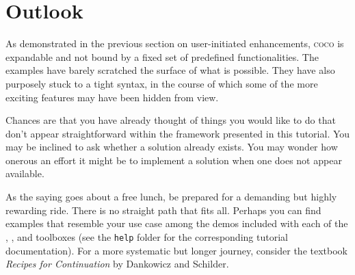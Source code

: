 \section{Outlook}
As demonstrated in the previous section on user-initiated enhancements, \textsc{coco} is expandable and not bound by a fixed set of predefined functionalities. The examples have barely scratched the surface of what is possible. They have also purposely stuck to a tight syntax, in the course of which some of the more exciting features may have been hidden from view.

Chances are that you have already thought of things you would like to do that don't appear straightforward within the framework presented in this tutorial. You may be inclined to ask whether a solution already exists. You may wonder how onerous an effort it might be to implement a solution when one does not appear available. 

As the saying goes about a free lunch, be prepared for a demanding but highly rewarding ride. There is no straight path that fits all. Perhaps you can find examples that resemble your use case among the demos included with each of the , , and  toolboxes (see the \texttt{help} folder for the corresponding tutorial documentation). For a more systematic but longer journey, consider the textbook \emph{Recipes for Continuation} by Dankowicz and Schilder.

